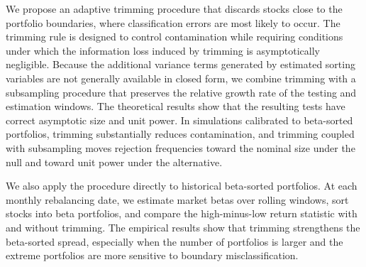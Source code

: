 We propose an adaptive trimming procedure that discards stocks close to the portfolio boundaries, where classification errors are most likely to occur. The trimming rule is designed to control contamination while requiring conditions under which the information loss induced by trimming is asymptotically negligible. Because the additional variance terms generated by estimated sorting variables are not generally available in closed form, we combine trimming with a subsampling procedure that preserves the relative growth rate of the testing and estimation windows. The theoretical results show that the resulting tests have correct asymptotic size and unit power. In simulations calibrated to beta-sorted portfolios, trimming substantially reduces contamination, and trimming coupled with subsampling moves rejection frequencies toward the nominal size under the null and toward unit power under the alternative.

We also apply the procedure directly to historical beta-sorted portfolios. At each monthly rebalancing date, we estimate market betas over rolling windows, sort stocks into beta portfolios, and compare the high-minus-low return statistic with and without trimming. The empirical results show that trimming strengthens the beta-sorted spread, especially when the number of portfolios is larger and the extreme portfolios are more sensitive to boundary misclassification.



